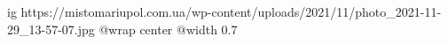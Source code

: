  
 
 
 
 

\ifcmt
  ig https://mistomariupol.com.ua/wp-content/uploads/2021/11/photo_2021-11-29_13-57-07.jpg
  @wrap center
  @width 0.7
\fi
